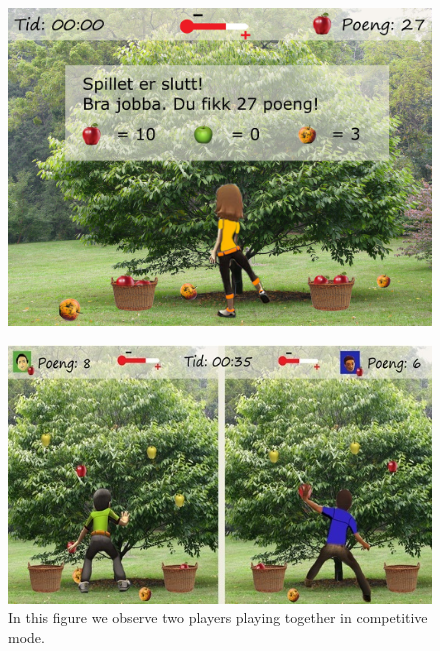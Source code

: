 \begin{figure} [H]
\centering
\includegraphics[scale=0.1]{appletreeend.jpg}
\label{fig:appleOverNorsk}
\end{figure}

\begin{figure} [H]
\centering
\includegraphics[scale=0.8]{multiplayereple.jpg}
\caption[Picking apples - multi player]{In this figure we observe two players playing together in competitive mode.}
\label{fig:appleMultiplayerNorsk}
\end{figure}


